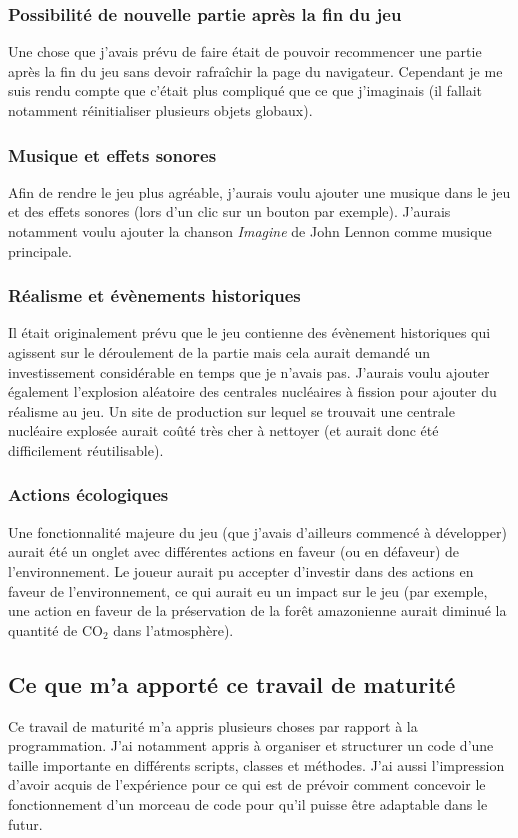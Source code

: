\documentclass{article}
\begin{document}
		\subsubsection{Possibilité de nouvelle partie après la fin du jeu}
		Une chose que j'avais prévu de faire était de pouvoir recommencer une partie après la fin du jeu sans devoir rafraîchir la page du navigateur. Cependant je me suis rendu compte que c'était plus compliqué que ce que j'imaginais (il fallait notamment réinitialiser plusieurs objets globaux).		
		
		\subsubsection{Musique et effets sonores}
		Afin de rendre le jeu plus agréable, j'aurais voulu ajouter une musique dans le jeu et des effets sonores (lors d'un clic sur un bouton par exemple). J'aurais notamment voulu ajouter la chanson \textit{Imagine} de John Lennon comme musique principale. 
		
		\subsubsection{Réalisme et évènements historiques}
		Il était originalement prévu que le jeu contienne des évènement historiques qui agissent sur le déroulement de la partie mais cela aurait demandé un investissement considérable en temps que je n'avais pas.
		J'aurais voulu ajouter également l'explosion aléatoire des centrales nucléaires à fission pour ajouter du réalisme au jeu. Un site de production sur lequel se trouvait une centrale nucléaire explosée aurait coûté très cher à nettoyer (et aurait donc été difficilement réutilisable).
		
		\subsubsection{Actions écologiques}
		Une fonctionnalité majeure du jeu (que j'avais d'ailleurs commencé à développer) aurait été un onglet avec différentes actions en faveur (ou en défaveur) de l'environnement. Le joueur aurait pu accepter d'investir dans des actions en faveur de l'environnement, ce qui aurait eu un impact sur le jeu (par exemple, une action en faveur de la préservation de la forêt amazonienne aurait diminué la quantité de CO$_{2}$ dans l'atmosphère).

				
		\subsection{Ce que m'a apporté ce travail de maturité}
		Ce travail de maturité m'a appris plusieurs choses par rapport à la programmation. J'ai notamment appris à organiser et structurer un code d'une taille importante en différents scripts, classes et méthodes. J'ai aussi l'impression d'avoir acquis de l'expérience pour ce qui est de prévoir comment concevoir le fonctionnement d'un morceau de code pour qu'il puisse être adaptable dans le futur.
		
\end{document}
